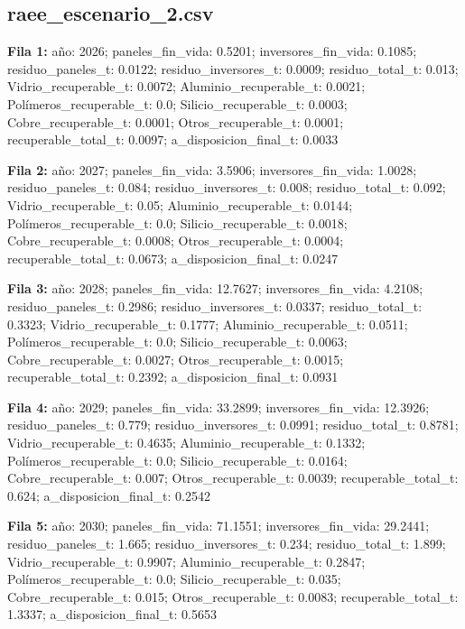 \subsection*{raee\_escenario\_2.csv}
{\footnotesize\textbf{Fila 1:} año: 2026; paneles\_fin\_vida: 0.5201; inversores\_fin\_vida: 0.1085; residuo\_paneles\_t: 0.0122; residuo\_inversores\_t: 0.0009; residuo\_total\_t: 0.013; Vidrio\_recuperable\_t: 0.0072; Aluminio\_recuperable\_t: 0.0021; Polímeros\_recuperable\_t: 0.0; Silicio\_recuperable\_t: 0.0003; Cobre\_recuperable\_t: 0.0001; Otros\_recuperable\_t: 0.0001; recuperable\_total\_t: 0.0097; a\_disposicion\_final\_t: 0.0033\par}
{\footnotesize\textbf{Fila 2:} año: 2027; paneles\_fin\_vida: 3.5906; inversores\_fin\_vida: 1.0028; residuo\_paneles\_t: 0.084; residuo\_inversores\_t: 0.008; residuo\_total\_t: 0.092; Vidrio\_recuperable\_t: 0.05; Aluminio\_recuperable\_t: 0.0144; Polímeros\_recuperable\_t: 0.0; Silicio\_recuperable\_t: 0.0018; Cobre\_recuperable\_t: 0.0008; Otros\_recuperable\_t: 0.0004; recuperable\_total\_t: 0.0673; a\_disposicion\_final\_t: 0.0247\par}
{\footnotesize\textbf{Fila 3:} año: 2028; paneles\_fin\_vida: 12.7627; inversores\_fin\_vida: 4.2108; residuo\_paneles\_t: 0.2986; residuo\_inversores\_t: 0.0337; residuo\_total\_t: 0.3323; Vidrio\_recuperable\_t: 0.1777; Aluminio\_recuperable\_t: 0.0511; Polímeros\_recuperable\_t: 0.0; Silicio\_recuperable\_t: 0.0063; Cobre\_recuperable\_t: 0.0027; Otros\_recuperable\_t: 0.0015; recuperable\_total\_t: 0.2392; a\_disposicion\_final\_t: 0.0931\par}
{\footnotesize\textbf{Fila 4:} año: 2029; paneles\_fin\_vida: 33.2899; inversores\_fin\_vida: 12.3926; residuo\_paneles\_t: 0.779; residuo\_inversores\_t: 0.0991; residuo\_total\_t: 0.8781; Vidrio\_recuperable\_t: 0.4635; Aluminio\_recuperable\_t: 0.1332; Polímeros\_recuperable\_t: 0.0; Silicio\_recuperable\_t: 0.0164; Cobre\_recuperable\_t: 0.007; Otros\_recuperable\_t: 0.0039; recuperable\_total\_t: 0.624; a\_disposicion\_final\_t: 0.2542\par}
{\footnotesize\textbf{Fila 5:} año: 2030; paneles\_fin\_vida: 71.1551; inversores\_fin\_vida: 29.2441; residuo\_paneles\_t: 1.665; residuo\_inversores\_t: 0.234; residuo\_total\_t: 1.899; Vidrio\_recuperable\_t: 0.9907; Aluminio\_recuperable\_t: 0.2847; Polímeros\_recuperable\_t: 0.0; Silicio\_recuperable\_t: 0.035; Cobre\_recuperable\_t: 0.015; Otros\_recuperable\_t: 0.0083; recuperable\_total\_t: 1.3337; a\_disposicion\_final\_t: 0.5653\par}
